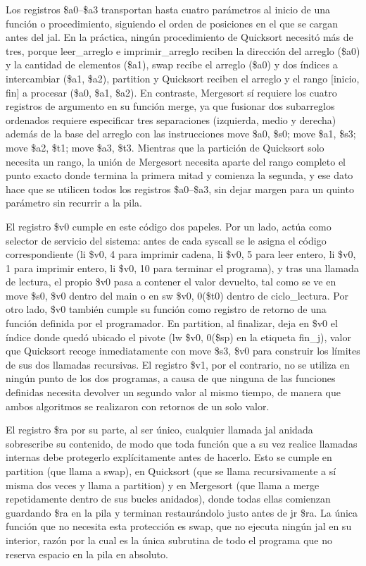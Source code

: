 \documentclass[12pt, letterpaper]{article}
\begin{document}
Los registros \$a0–\$a3 transportan hasta cuatro parámetros al inicio de una función o procedimiento, siguiendo el orden de posiciones en el que se cargan antes del jal. En la práctica, ningún procedimiento de Quicksort necesitó más de tres, porque leer\_arreglo e imprimir\_arreglo reciben la dirección del arreglo (\$a0) y la cantidad de elementos (\$a1), swap recibe el arreglo (\$a0) y dos índices a intercambiar (\$a1, \$a2), partition y Quicksort reciben el arreglo y el rango [inicio, fin] a procesar (\$a0, \$a1, \$a2). En contraste, Mergesort sí requiere los cuatro registros de argumento en su función merge, ya que fusionar dos subarreglos ordenados requiere especificar tres separaciones (izquierda, medio y derecha) además de la base del arreglo con las instrucciones move \$a0, \$s0; move \$a1, \$s3; move \$a2, \$t1; move \$a3, \$t3. Mientras que la partición de Quicksort solo necesita un rango, la unión de Mergesort necesita aparte del rango completo el punto exacto donde termina la primera mitad y comienza la segunda, y ese dato hace que se utilicen todos los registros \$a0–\$a3, sin dejar margen para un quinto parámetro sin recurrir a la pila.

El registro \$v0 cumple en este código dos papeles. Por un lado, actúa como selector de servicio del sistema: antes de cada syscall se le asigna el código correspondiente (li \$v0, 4 para imprimir cadena, li \$v0, 5 para leer entero, li \$v0, 1 para imprimir entero, li \$v0, 10 para terminar el programa), y tras una llamada de lectura, el propio \$v0 pasa a contener el valor devuelto, tal como se ve en move \$s0, \$v0 dentro del main o en sw \$v0, 0(\$t0) dentro de ciclo\_lectura. Por otro lado, \$v0 también cumple su función como registro de retorno de una función definida por el programador. En partition, al finalizar, deja en \$v0 el índice donde quedó ubicado el pivote (lw \$v0, 0(\$sp) en la etiqueta fin\_j), valor que Quicksort recoge inmediatamente con move \$s3, \$v0 para construir los límites de sus dos llamadas recursivas. El registro \$v1, por el contrario, no se utiliza en ningún punto de los dos programas, a causa de que ninguna de las funciones definidas necesita devolver un segundo valor al mismo tiempo, de manera que ambos algoritmos se realizaron con retornos de un solo valor.

El registro \$ra por su parte, al ser único, cualquier llamada jal anidada sobrescribe su contenido, de modo que toda función que a su vez realice llamadas internas debe protegerlo explícitamente antes de hacerlo. Esto se cumple en partition (que llama a swap), en Quicksort (que se llama recursivamente a sí misma dos veces y llama a partition) y en Mergesort (que llama a merge repetidamente dentro de sus bucles anidados), donde todas ellas comienzan guardando \$ra en la pila y terminan restaurándolo justo antes de jr \$ra. La única función que no necesita esta protección es swap, que no ejecuta ningún jal en su interior, razón por la cual es la única subrutina de todo el programa que no reserva espacio en la pila en absoluto.
\end{document}
